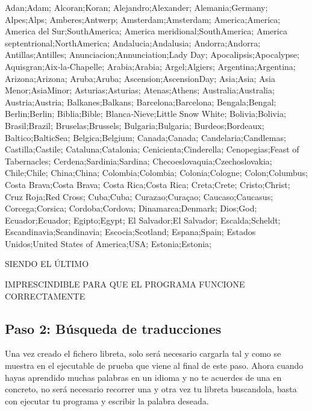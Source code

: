 \begin{DoxyCodeInclude}
Adan;Adam;
Alcoran;Koran;
Alejandro;Alexander;
Alemania;Germany;
Alpes;Alps;
Amberes;Antwerp;
Amsterdam;Amsterdam;
America;America;
America del Sur;SouthAmerica;
America meridional;SouthAmerica;
America septentrional;NorthAmerica;
Andalucia;Andalusia;
Andorra;Andorra;
Antillas;Antilles;
Anunciacion;Annunciation;Lady Day;
Apocalipsis;Apocalypse;
Aquisgran;Aix‐la‐Chapelle;
Arabia;Arabia;
Argel;Algiers;
Argentina;Argentina;
Arizona;Arizona;
Aruba;Aruba;
Ascension;AscensionDay;
Asia;Asia;
Asia Menor;AsiaMinor;
Asturias;Asturias;
Atenas;Athens;
Australia;Australia;
Austria;Austria;
Balkanes;Balkans;
Barcelona;Barcelona;
Bengala;Bengal;
Berlin;Berlin;
Biblia;Bible;
Blanca‐Nieve;Little Snow White;
Bolivia;Bolivia;
Brasil;Brazil;
Bruselas;Brussels;
Bulgaria;Bulgaria;
Burdeos;Bordeaux;
Baltico;BalticSea;
Belgica;Belgium;
Canada;Canada;
Candelaria;Candlemas;
Castilla;Castile;
Cataluna;Catalonia;
Cenicienta;Cinderella;
Cenopegias;Feast of Tabernacles;
Cerdena;Sardinia;Sardina;
Checoeslovaquia;Czechoslovakia;
Chile;Chile;
China;China;
Colombia;Colombia;
Colonia;Cologne;
Colon;Columbus;
Costa Brava;Costa Brava;
Costa Rica;Costa Rica;
Creta;Crete;
Cristo;Christ;
Cruz Roja;Red Cross;
Cuba;Cuba;
Curazao;Curaçao;
Caucaso;Caucasus;
Corcega;Corsica;
Cordoba;Cordova;
Dinamarca;Denmark;
Dios;God;
Ecuador;Ecuador;
Egipto;Egypt;
El Salvador;El Salvador;
Escalda;Scheldt;
Escandinavia;Scandinavia;
Escocia;Scotland;
Espana;Spain;
Estados Unidos;United States of America;USA;
Estonia;Estonia;

\end{DoxyCodeInclude}
 S\-I\-E\-N\-D\-O E\-L Ú\-L\-T\-I\-M\-O \par
 I\-M\-P\-R\-E\-S\-C\-I\-N\-D\-I\-B\-L\-E P\-A\-R\-A Q\-U\-E E\-L P\-R\-O\-G\-R\-A\-M\-A F\-U\-N\-C\-I\-O\-N\-E C\-O\-R\-R\-E\-C\-T\-A\-M\-E\-N\-T\-E\hypertarget{index_step2}{}\subsection{Paso 2\-: Búsqueda de traducciones}\label{index_step2}
Una vez creado el fichero libreta, solo será necesario cargarla tal y como se muestra en el ejecutable de prueba que viene al final de este paso. Ahora cuando hayas aprendido muchas palabras en un idioma y no te acuerdes de una en concreto, no será necesario recorrer una y otra vez tu libreta buscandola, basta con ejecutar tu programa y escribir la palabra deseada.


